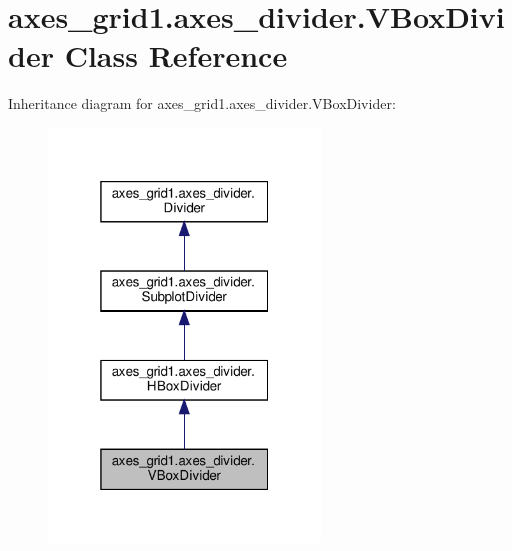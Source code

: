 \hypertarget{classaxes__grid1_1_1axes__divider_1_1VBoxDivider}{}\section{axes\+\_\+grid1.\+axes\+\_\+divider.\+V\+Box\+Divider Class Reference}
\label{classaxes__grid1_1_1axes__divider_1_1VBoxDivider}


Inheritance diagram for axes\+\_\+grid1.\+axes\+\_\+divider.\+V\+Box\+Divider\+:
\nopagebreak
\begin{figure}[H]
\begin{center}
\leavevmode
\includegraphics[width=205pt]{classaxes__grid1_1_1axes__divider_1_1VBoxDivider__inherit__graph}
\end{center}
\end{figure}


